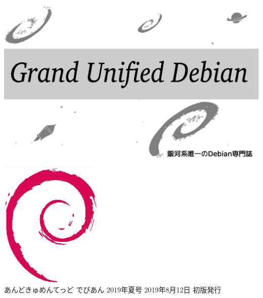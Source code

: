 \documentclass[mingoth,a4paper]{jsarticle}
\begin{document}
\begin{titlepage}
\thispagestyle{empty}

\hspace*{-2.5cm}
\includegraphics{image2012-natsu/gudeb.eps}\\
\vspace*{0.1cm}

\vspace*{2cm}

\vspace*{-1.5cm}
\hspace*{11cm}\includegraphics[height=6cm]{image200502/openlogo-nd.eps}\\
\vspace*{0.1cm}
\hfill あんどきゅめんてっど でびあん 2019年夏号 2019年8月12日 初版発行
\end{titlepage}

\newpage
\thispagestyle{empty}\mbox{}
\newpage
\end{document}
